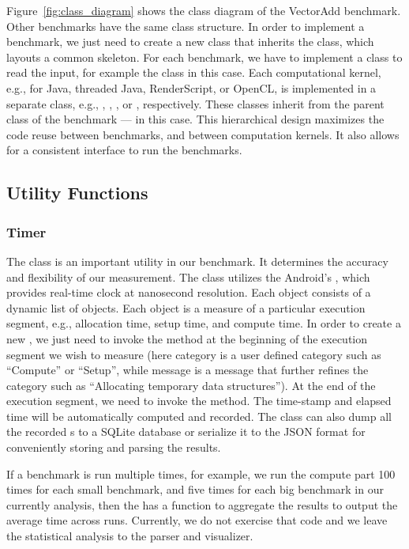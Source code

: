 Figure~\ref{fig:class_diagram} shows the class diagram of the VectorAdd benchmark.
Other benchmarks have the same class structure. In order to implement a
benchmark, we just need to create a new class that inherits the  class, which
layouts a common skeleton. For each benchmark, we have to implement a class to
read the input, for example the  class in this case. Each
computational kernel, e.g., for Java, threaded Java, RenderScript, or OpenCL, is
implemented in a separate class, e.g., ,
, , or ,
respectively. These classes inherit from the parent class of the benchmark ---
 in this case. This hierarchical design
maximizes the code reuse between benchmarks, and between computation kernels.  It
also allows for a consistent interface to run the benchmarks.


\subsection{Utility Functions}
\subsubsection{Timer}
The  class is an important utility in our benchmark. It
determines the accuracy and flexibility of our measurement. The 
class utilizes the Android's , which provides real-time clock at
nanosecond resolution. Each  object consists of a dynamic list of
 objects. Each  object is a measure of a
particular execution segment, e.g., allocation time, setup time, and compute
time. In order to create a new , we just need to invoke the
 method at the beginning of the execution
segment we wish to measure (here category is a user defined category such as
``Compute'' or ``Setup'', while message is a message that further refines the
category such as ``Allocating temporary data structures''). At the end of the
execution segment, we need to invoke the  method. The
time-stamp and elapsed time will be automatically computed and recorded.
The  class can also dump all the recorded s to a
SQLite database or serialize it to the JSON format for conveniently storing and
parsing the results.

If a benchmark is run multiple times, for example, we run the compute part 100
times for each small benchmark, and five times for each big benchmark in our
currently analysis, then the  has a function to aggregate the results
to output the average time across runs.  Currently, we do not exercise that code
and we leave the statistical analysis to the parser and visualizer.

